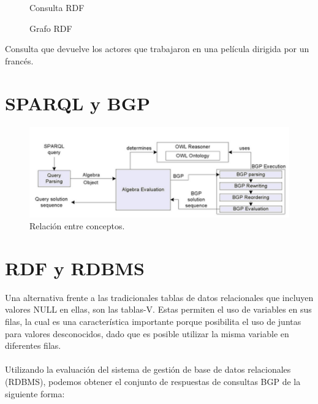 \documentclass[10pt,a4paper]{article}
\begin{document}
\begin{figure}[H]
{                }%
        \fi
        \noindent
        \parbox{.45\textwidth}{%
                \centering
                \caption{Consulta RDF}
                \label{fg:methods}
        }%
        \hfil
        \parbox{.45\textwidth}{%
                \centering
                \caption{Grafo RDF}
                \label{fg:method_detail}
        }%
\end{figure}
\vspace*{0.3cm}
Consulta que devuelve los actores que trabajaron en una película dirigida por un francés.

\section{SPARQL y BGP}

\begin{figure}[H] %
\begin{center}
\includegraphics[width=400pt]{./imgs/conceptos.png}
\caption{Relación entre conceptos.}
\end{center}
\end{figure}

\section{RDF y RDBMS}
Una alternativa frente a las tradicionales tablas de datos relacionales que incluyen valores NULL en ellas, son las tablas-V. Estas permiten el uso de variables en sus filas, la cual es una característica importante porque posibilita el uso de juntas para valores desconocidos, dado que es posible utilizar la misma variable en diferentes filas.
\\\\
Utilizando la evaluación del sistema de gestión de base de datos relacionales (RDBMS), podemos obtener el conjunto de respuestas de consultas BGP de la siguiente forma:
\end{document}
